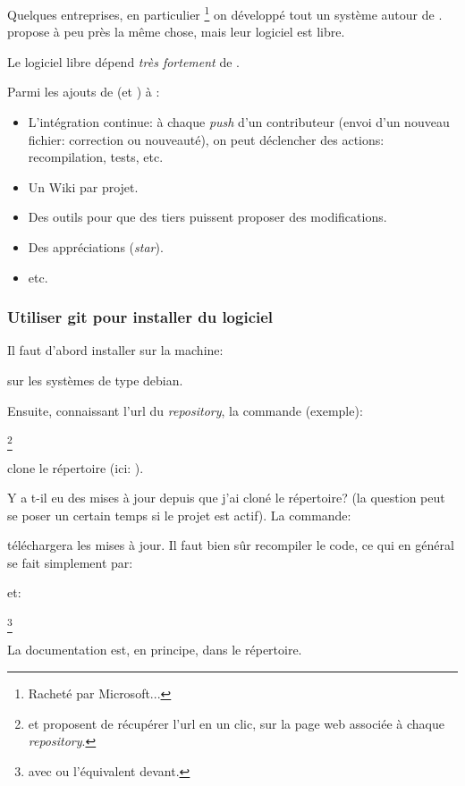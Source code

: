 Quelques entreprises, en particulier \footnote{Racheté par
  Microsoft...} on développé tout un système autour de
.  propose à peu près la même chose, mais leur
logiciel est libre.

Le logiciel libre dépend \emph{très fortement} de .

Parmi les ajouts de  (et  ) à :

\begin{itemize}
  \item L'intégration continue: à chaque \emph{push} d'un contributeur
    (envoi d'un nouveau fichier: correction ou nouveauté), on
    peut déclencher des actions: recompilation, tests, etc.
  \item Un Wiki par \og projet\fg.
  \item Des outils pour que des tiers puissent proposer des
    modifications.
  \item Des appréciations (\emph{star}).
  \item etc.
\end{itemize}

\subsubsection{Utiliser git pour installer du logiciel}

Il faut d'abord installer  sur la machine:
\begin{center}
\end{center}
  
sur les systèmes de type debian.

Ensuite, connaissant l'url du \emph{repository}, la commande (exemple):

\begin{center}
\footnote{
et  proposent de récupérer l'url en un clic, sur la page
web associée à chaque \emph{repository}.}
\end{center}
  
clone le répertoire (ici: ).

Y a t-il eu des mises à jour depuis que j'ai cloné le répertoire? (la
question peut se poser un certain temps si le projet est actif). La
commande:
\begin{center}
\end{center}

 téléchargera les mises à jour. Il faut bien sûr recompiler le
code, ce qui en général se fait simplement par:


et:

\footnote{avec  ou l'équivalent devant.}

La documentation est, en principe, dans le répertoire.
